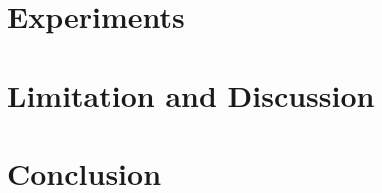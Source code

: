\documentclass{article}
\begin{document}
\section{Experiments}
\label{sec:experiment}


\section{Limitation and Discussion}
\label{sec:limitation}


% 

\section{Conclusion}
\label{sec:conclusion}


\newpage




\newpage


\clearpage


\newpage

\end{document}
